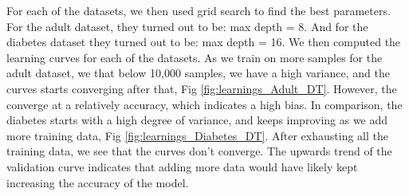 \documentclass[11pt, twocolumn]{article}
\begin{document}
    For each of the datasets, we then used grid search to find the best parameters. For the adult dataset, they turned out to be: max depth = 8. And for the diabetes dataset they turned out to be: max depth = 16. We then computed the learning curves for each of the datasets. As we train on more samples for the adult dataset, we that below 10,000 samples, we have a high variance, and the curves starts converging after that, Fig \ref{fig:learnings_Adult_DT}. However, the converge at a relatively accuracy, which indicates a high bias. In comparison, the diabetes starts with a high degree of variance, and keeps improving as we add more training data, Fig \ref{fig:learnings_Diabetes_DT}. After exhausting all the training data, we see that the curves don't converge. The upwards trend of the validation curve indicates that adding more data would have likely kept increasing the accuracy of the model.
\end{document}
